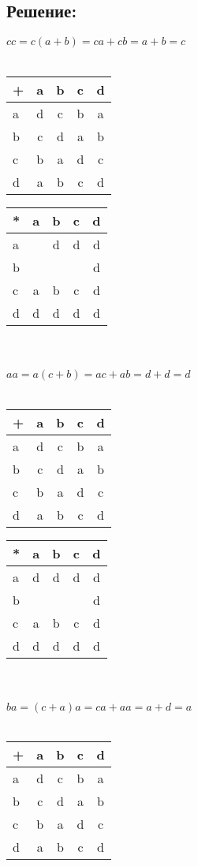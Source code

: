 \documentclass[12pt]{article}
\begin{document}
	\subsection*{Решение:}
	\(cc = c(a + b) = ca + cb = a + b = c\) \\\\
	\begin{tabular}{ l | c c c c  }
	  + & a & b & c & d \\ \hline
	  a & d & c & b & a \\
	  b & c & d & a & b \\
	  c & b & a & d & c \\
	  d & a & b & c & d
	\end{tabular} \quad \quad \quad
	\begin{tabular}{ l | c c c c  }
	  * & a & b & c & d \\ \hline
	  a & ~ & d & d & d \\
	  b & ~ & ~ & ~ & d \\
	  c & a & b & c & d \\
	  d & d & d & d & d
	\end{tabular} \\\\
	\(aa = a(c + b) = ac + ab = d + d = d\) \\\\
	\begin{tabular}{ l | c c c c  }
	  + & a & b & c & d \\ \hline
	  a & d & c & b & a \\
	  b & c & d & a & b \\
	  c & b & a & d & c \\
	  d & a & b & c & d
	\end{tabular} \quad \quad \quad
	\begin{tabular}{ l | c c c c  }
	  * & a & b & c & d \\ \hline
	  a & d & d & d & d \\
	  b & ~ & ~ & ~ & d \\
	  c & a & b & c & d \\
	  d & d & d & d & d
	\end{tabular} \\\\
	\(ba = (c + a)a = ca + aa = a + d = a\) \\\\
	\begin{tabular}{ l | c c c c  }
	  + & a & b & c & d \\ \hline
	  a & d & c & b & a \\
	  b & c & d & a & b \\
	  c & b & a & d & c \\
	  d & a & b & c & d
	\end{tabular} \quad \quad \quad
\end{document}
